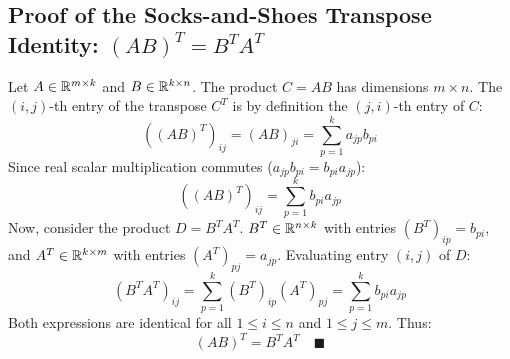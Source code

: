 \subsection{Proof of the Socks-and-Shoes Transpose Identity: $(AB)^T = B^T A^T$}
Let $A \in \mathbb{R}^{m \times k}$ and $B \in \mathbb{R}^{k \times n}$. The product $C = AB$ has dimensions $m \times n$.
The $(i, j)$-th entry of the transpose $C^T$ is by definition the $(j, i)$-th entry of $C$:
\begin{equation}
( (AB)^T )_{ij} = (AB)_{ji} = \sum_{p=1}^k a_{jp} b_{pi}
\end{equation}
Since real scalar multiplication commutes ($a_{jp} b_{pi} = b_{pi} a_{jp}$):
\begin{equation}
( (AB)^T )_{ij} = \sum_{p=1}^k b_{pi} a_{jp}
\end{equation}
Now, consider the product $D = B^T A^T$. 
$B^T \in \mathbb{R}^{n \times k}$ with entries $(B^T)_{ip} = b_{pi}$, and $A^T \in \mathbb{R}^{k \times m}$ with entries $(A^T)_{pj} = a_{jp}$.
Evaluating entry $(i, j)$ of $D$:
\begin{equation}
(B^T A^T)_{ij} = \sum_{p=1}^k (B^T)_{ip} (A^T)_{pj} = \sum_{p=1}^k b_{pi} a_{jp}
\end{equation}
Both expressions are identical for all $1 \le i \le n$ and $1 \le j \le m$. Thus:
\begin{equation}
(AB)^T = B^T A^T \quad \blacksquare
\end{equation}

